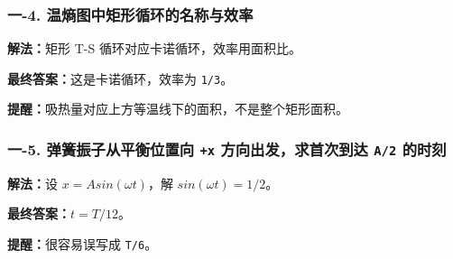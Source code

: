 \documentclass[12pt,a4paper]{ctexart}
\begin{document}
\subsubsection*{一-4. 温熵图中矩形循环的名称与效率}
\begin{tcolorbox}[colback=gray!2!white,colframe=black!60,title={题目}]

\end{tcolorbox}
\begin{tcolorbox}[colback=blue!2!white,colframe=blue!55!black,title={完整答案}]
\textbf{解法：}矩形 T-S 循环对应卡诺循环，效率用面积比。\par
\textbf{最终答案：}这是卡诺循环，效率为 \texttt{1/3}。\par

\end{tcolorbox}
\begin{tcolorbox}[colback=red!2!white,colframe=red!55!black,title={易错点}]
\textbf{提醒：}吸热量对应上方等温线下的面积，不是整个矩形面积。\par
\end{tcolorbox}

\subsubsection*{一-5. 弹簧振子从平衡位置向 \texttt{+x} 方向出发，求首次到达 \texttt{A/2} 的时刻}
\begin{tcolorbox}[colback=gray!2!white,colframe=black!60,title={题目}]

\end{tcolorbox}
\begin{tcolorbox}[colback=blue!2!white,colframe=blue!55!black,title={完整答案}]
\textbf{解法：}设 \(x=A sin(ωt)\)，解 \(sin(ωt)=1/2\)。\par
\textbf{最终答案：}\(t=T/12\)。\par

\end{tcolorbox}
\begin{tcolorbox}[colback=red!2!white,colframe=red!55!black,title={易错点}]
\textbf{提醒：}很容易误写成 \texttt{T/6}。\par
\end{tcolorbox}
\end{document}
